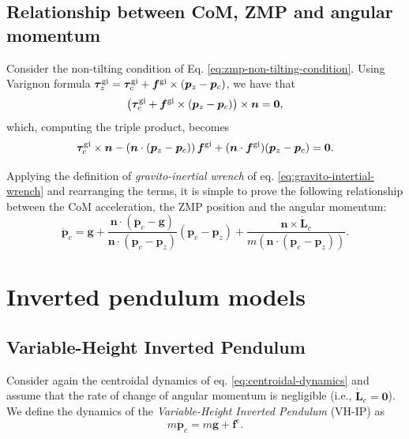 \subsection{Relationship between CoM, ZMP and angular momentum}
Consider the non-tilting condition of Eq. \eqref{eq:zmp-non-tilting-condition}. Using Varignon formula $\bm{\tau}_z^{\rm gi} = \bm{\tau}_c^{\rm gi} + \bm{f}^{\rm gi} \times (\bm{p}_z - \bm{p}_c)$, we have that
\begin{equation}
    \left(\bm{\tau}_c^{\rm gi} + \bm{f}^{\rm gi} \times (\bm{p}_z - \bm{p}_c)\right) \times \bm{n} = \bm{0},
\end{equation}
which, computing the triple product, becomes
\begin{equation}
    \bm{\tau}_c^{\rm gi} \times \bm{n} - \left(\bm{n} \cdot (\bm{p}_z - \bm{p}_c)\right) \bm{f}^{\rm gi} + (\bm{n} \cdot \bm{f}^{\rm gi}) (\bm{p}_z - \bm{p}_c) = \bm{0}.
\end{equation}

Applying the definition of \textit{gravito-inertial wrench} of eq. \eqref{eq:gravito-intertial-wrench} and rearranging the terms, it is simple to prove \cite{Caron2017TRO} the following relationship between the CoM acceleration, the ZMP position and the angular momentum:
\begin{equation}
    \label{eq:relationship-com-zmp-angular-momentum}
    \ddot{\bm{p}}_c = \bm{g} + \frac{\bm{n} \cdot (\bm{\ddot{p}}_c - \bm{g})}{\bm{n} \cdot (\bm{p}_c - \bm{p}_z)} (\bm{p}_c - \bm{p}_z) + \frac{\bm{n} \times \bm{\dot{L}}_c}{m \left(\bm{n} \cdot (\bm{p}_c - \bm{p}_z)\right)}.
\end{equation}
\section{Inverted pendulum models}
\subsection{Variable-Height Inverted Pendulum}
Consider again the centroidal dynamics of eq. \eqref{eq:centroidal-dynamics}
and assume that the rate of change of angular momentum is negligible (i.e.,
$\dot{\bm{L}}_c=\bm{0}$). We define the dynamics of the \textit{Variable-Height
Inverted Pendulum} (VH-IP) \cite{Koolen2016VHIP, Caron2019CapturabilitybasedPatternGeneration} as
\begin{equation}
    \label{eq:VH-IP}
    m \ddot{\bm{p}}_c = m \bm{g} + \bm{f}^{\mathrm{c}}.
\end{equation}

